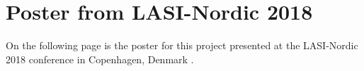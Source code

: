 \documentclass[../Main/thesis.tex]{subfiles}
\begin{document}
\chapter{Poster from LASI-Nordic 2018}
\label{app:lasi-poster}
On the following page is the poster for this project presented at the LASI-Nordic 2018 conference in Copenhagen, Denmark \citep{Wake2018}. 


\end{document}
